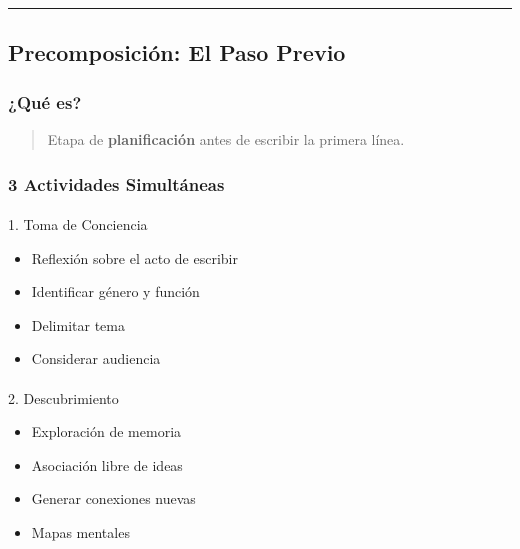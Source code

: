 \documentclass[
  11pt,
]{beaner}
\makeatletter
\let\oldparagraph\paragraph
\renewcommand{\paragraph}{
    \@ifstar
      \xxxParagraphStar
      \xxxParagraphNoStar
  }
\newcommand{\xxxParagraphStar}[1]{\oldparagraph*{#1}\mbox{}}
\newcommand{\xxxParagraphNoStar}[1]{\oldparagraph{#1}\mbox{}}
\providecommand{\tightlist}{%
  \setlength{\itemsep}{0pt}\setlength{\parskip}{0pt}}
\makeatother
\begin{document}
\begin{center}\rule{0.5\linewidth}{0.5pt}\end{center}

\subsection{Precomposición: El Paso
Previo}\label{precomposiciuxf3n-el-paso-previo}

\subsubsection{¿Qué es?}\label{quuxe9-es}

\begin{quote}
Etapa de \textbf{planificación} antes de escribir la primera línea.
\end{quote}

\subsubsection{3 Actividades
Simultáneas}\label{actividades-simultuxe1neas}

\paragraph{1. Toma de Conciencia}\label{toma-de-conciencia}

\begin{itemize}
\tightlist
\item
  Reflexión sobre el acto de escribir
\item
  Identificar género y función
\item
  Delimitar tema
\item
  Considerar audiencia
\end{itemize}

\paragraph{2. Descubrimiento}\label{descubrimiento}

\begin{itemize}
\tightlist
\item
  Exploración de memoria
\item
  Asociación libre de ideas
\item
  Generar conexiones nuevas
\item
  Mapas mentales
\end{itemize}
\end{document}
